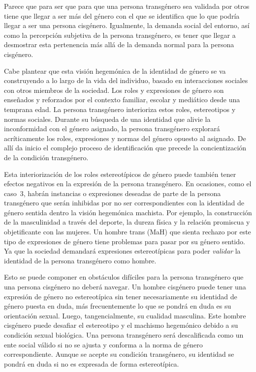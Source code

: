 Parece que para ser que para que una persona transgénero sea validada por otros
tiene que llegar a ser más del género con el que se identifica que lo que podría
llegar a ser una persona cisgénero. Igualmente, la demanda social del entorno,
así como la percepción subjetiva de la persona transgénero, es tener que llegar
a desmostrar esta pertenencia más allá de la demanda normal para la persona
cisgénero.

Cabe plantear que esta visión hegemónica de la identidad de género se va
construyendo a lo largo de la vida del individuo, basado en interacciones
sociales con otros miembros de la sociedad. Los roles y expresiones de género
son enseñados y reforzados por el contexto familiar, escolar y mediático desde
una temprana edad. La persona transgénero interioriza estos roles, estereotipos
y normas sociales. Durante su búsqueda de una identidad que alivie la
inconformidad con el género asignado, la persona transgénero explorará
acríticamente los roles, expresiones y normas del género opuesto al asignado. De
allí da inicio el complejo proceso de identificación que precede la
concientización de la condición transgénero.

Esta interiorización de los roles estereotípicos de género puede también tener
efectos negativos en la expresión de la persona transgénero. En ocasiones, como
el caso~3, habrán instancias o expresiones deseadas de parte de la persona
transgénero que serán inhibidas por no ser correspondientes con la identidad de
género sentida dentro la visión hegemónica machista. Por ejemplo, la
construcción de la masculinidad a través del deporte, la dureza física y la
relación promiscua y objetificante con las mujeres. Un hombre trans (MaH) que
sienta rechazo por este tipo de expresiones de género tiene problemas para pasar
por su género sentido. Ya que la sociedad demandará expresiones estereotípicas
para poder \emph{validar} la identidad de la persona transgénero como hombre.

Esto se puede componer en obstáculos difíciles para la persona transgénero que
una persona cisgénero no deberá navegar. Un hombre cisgénero puede tener una
expresión de género no estereotípica sin tener necesariamente su identidad de
género puesta en duda, más frecuentemente lo que se pondrá en duda es su
orientación sexual. Luego, tangencialmente, su cualidad masculina. Este hombre
cisgénero puede desafiar el estereotipo y el machismo hegemónico debido a su
condición sexual biológica. Una persona transgénero será descalificada como un
ente social válido si no se ajusta y conforma a la norma de género
correspondiente. Aunque se acepte su condición transgénero, su identidad se
pondrá en duda si no es expresada de forma estereotípica.

